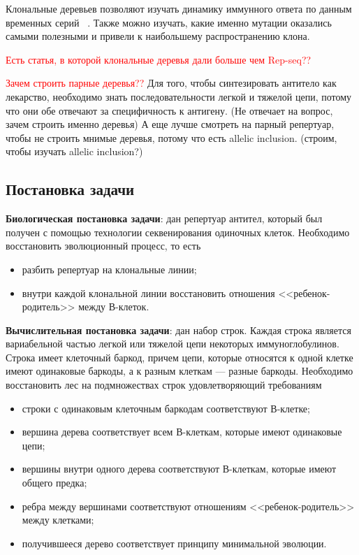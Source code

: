 \documentclass{spbau-diploma}
\newcommand{\todo}{\textcolor{red}}
\begin{document}
Клональные деревьев позволяют изучать динамику иммунного ответа по данным временных серий ~\cite{hoehn2015dynamics}.
Также можно изучать, какие именно мутации оказались самыми полезными и привели к наибольшему распространению клона.

\todo{Есть статья, в которой клональные деревья дали больше чем Rep-seq??}


\todo{Зачем строить парные деревья??}
Для того, чтобы синтезировать антитело как лекарство, необходимо знать последовательности легкой и тяжелой цепи, потому что они обе отвечают за специфичность к антигену. 
(Не отвечает на вопрос, зачем строить именно деревья)
А еще лучше смотреть на парный репертуар, чтобы не строить мнимые деревья, потому что есть allelic inclusion. 
(строим, чтобы изучать allelic inclusion?)


\subsection{Постановка задачи}

\textbf{Биологическая постановка задачи}: дан репертуар антител, который был получен с помощью технологии секвенирования одиночных клеток. 
Необходимо восстановить эволюционный процесс, то есть
\begin{itemize}
    \item  разбить репертуар на клональные линии;
    \item  внутри каждой клональной линии восстановить отношения <<ребенок-родитель>> между В-клеток. 
\end{itemize}

\textbf{Вычислительная постановка задачи}: дан набор строк. 
Каждая строка является вариабельной частью легкой или тяжелой цепи некоторых иммуноглобулинов. 
Строка имеет клеточный баркод, причем цепи, которые относятся к одной клетке имеют одинаковые баркоды, а к разным клеткам --- разные баркоды. 
Необходимо восстановить лес на подмножествах строк удовлетворяющий требованиям
\begin{itemize}
    \item строки с одинаковым клеточным баркодам соответствуют В-клетке;
    \item вершина дерева соответствует всем В-клеткам, которые имеют одинаковые цепи;
    \item вершины внутри одного дерева соответствуют В-клеткам, которые имеют общего предка;
    \item ребра между вершинами соответствуют отношениям <<ребенок-родитель>> между клетками;
    \item получившееся дерево соответствует принципу минимальной эволюции. 
\end{itemize}
\end{document}
